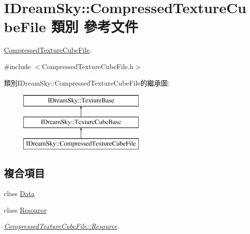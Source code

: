 \hypertarget{class_i_dream_sky_1_1_compressed_texture_cube_file}{}\section{I\+Dream\+Sky\+:\+:Compressed\+Texture\+Cube\+File 類別 參考文件}
\label{class_i_dream_sky_1_1_compressed_texture_cube_file}


\hyperlink{class_i_dream_sky_1_1_compressed_texture_cube_file}{Compressed\+Texture\+Cube\+File}.  




{\ttfamily \#include $<$Compressed\+Texture\+Cube\+File.\+h$>$}

類別\+I\+Dream\+Sky\+:\+:Compressed\+Texture\+Cube\+File的繼承圖\+:\begin{figure}[H]
\begin{center}
\leavevmode
\includegraphics[height=3.000000cm]{class_i_dream_sky_1_1_compressed_texture_cube_file}
\end{center}
\end{figure}
\subsection*{複合項目}
\begin{DoxyCompactItemize}
\item 
class \hyperlink{class_i_dream_sky_1_1_compressed_texture_cube_file_1_1_data}{Data}
\item 
class \hyperlink{class_i_dream_sky_1_1_compressed_texture_cube_file_1_1_resource}{Resource}
\begin{DoxyCompactList}\small\item\em \hyperlink{class_i_dream_sky_1_1_compressed_texture_cube_file_1_1_resource}{Compressed\+Texture\+Cube\+File\+::\+Resource}. \end{DoxyCompactList}\end{DoxyCompactItemize}
